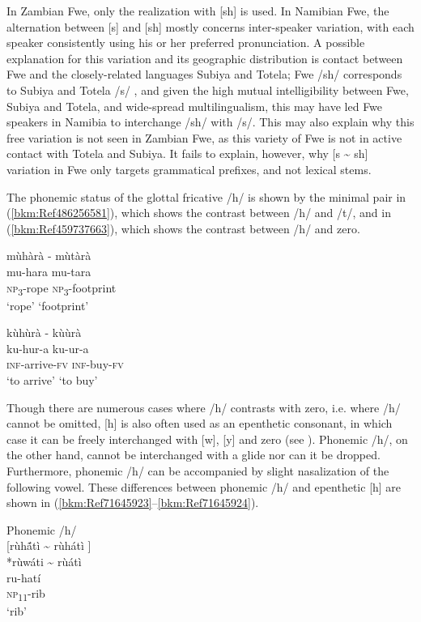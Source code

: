 In Zambian Fwe, only the realization with [sh] is used. In Namibian Fwe, the alternation between [s] and [sh] mostly concerns inter-speaker variation, with each speaker consistently using his or her preferred pronunciation. A possible explanation for this variation and its geographic distribution is contact between Fwe and the closely-related languages Subiya and Totela; Fwe /sh/ corresponds to Subiya and Totela /s/ \citep[116]{Bostoen2009}, and given the high mutual intelligibility between Fwe, Subiya and Totela, and wide-spread multilingualism, this may have led Fwe speakers in Namibia to interchange /sh/ with /s/. This may also explain why this free variation is not seen in Zambian Fwe, as this variety of Fwe is not in active contact with Totela and Subiya. It fails to explain, however, why [s {\textasciitilde} sh] variation in Fwe only targets grammatical prefixes, and not lexical stems.

The phonemic status of the glottal fricative /h/ is shown by the minimal pair in (\ref{bkm:Ref486256581}), which shows the contrast between /h/ and /t/, and in (\ref{bkm:Ref459737663}), which shows the contrast between /h/ and zero.

\ea
\label{bkm:Ref486256581}
mùhàrà \tab   - \tab  mùtàrà\\
mu-hara   \tab\tab   mu-tara\\
\textsc{np}\textsubscript{3}-rope   \tab\tab   \textsc{np}\textsubscript{3}-footprint\\
‘rope’ \tab\tab       ‘footprint’
\z

\newpage
\ea
\label{bkm:Ref459737663}
kùhùrà \tab    - \tab  kùùrà\\
ku-hur-a  \tab\tab    ku-ur-a\\
\textsc{inf}-arrive-\textsc{fv}   \tab\tab   \textsc{inf}-buy-\textsc{fv}\\
\glt ‘to arrive’ \tab\tab     ‘to buy’
\z

Though there are numerous cases where /h/ contrasts with zero, i.e. where /h/ cannot be omit\-ted, [h] is also often used as an epenthetic consonant, in which case it can be freely interchanged with [w], [y] and zero (see ). Phonemic /h/, on the other hand, cannot be interchanged with a glide nor can it be dropped. Furthermore, phonemic /h/ can be accompanied by slight nasalization of the following vowel. These differences between phonemic /h/ and epenthetic [h] are shown in (\ref{bkm:Ref71645923}--\ref{bkm:Ref71645924}).

\ea
\label{bkm:Ref71645923}
  Phonemic /h/\\
\ea
{}[rùh\'{\~{a}}tì {\textasciitilde} rùhátì  ]\\
*rùwáti {\textasciitilde} rùátì\\
ru-hatí\\
\textsc{np}\textsubscript{11}-rib\\
\glt ‘rib’

